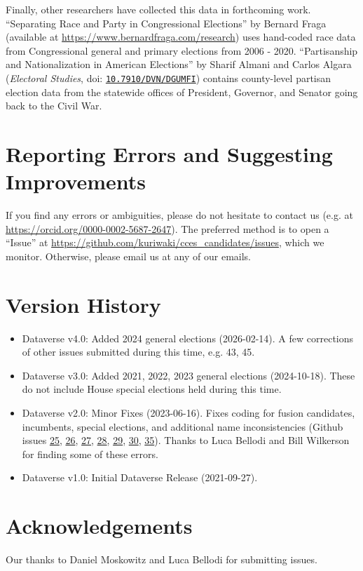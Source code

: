 \documentclass[12pt]{article}
\begin{document}


Finally, other researchers have collected this data in forthcoming work. ``Separating Race and Party in Congressional
Elections'' by Bernard Fraga (available at \url{https://www.bernardfraga.com/research}) uses hand-coded race data from Congressional general and primary elections from 2006 - 2020. ``Partisanship and Nationalization in American Elections'' by Sharif Almani and Carlos Algara (\emph{Electoral Studies}, doi: \href{https://doi.org/10.7910/DVN/DGUMFI}{\texttt{10.7910/DVN/DGUMFI}}) contains county-level partisan election data from the statewide offices of President, Governor, and Senator going back to the Civil War.

\section{Reporting Errors and Suggesting Improvements}

If you find any errors or ambiguities, please do not hesitate to contact us (e.g. at \url{https://orcid.org/0000-0002-5687-2647}). The preferred method is to open a ``Issue'' at \url{https://github.com/kuriwaki/cces_candidates/issues}, which we monitor. Otherwise, please email us at any of our emails.



\section{Version History}

\begin{itemize}
\item Dataverse v4.0: Added 2024 general elections (2026-02-14). A few corrections of other issues submitted during this time, e.g. 43, 45.
\item Dataverse v3.0: Added 2021, 2022, 2023 general elections (2024-10-18). These do not include House special elections held during this time.
\item Dataverse v2.0: Minor Fixes (2023-06-16). Fixes coding for fusion candidates, incumbents, special elections, and additional name inconsistencies (Github issues \href{https://github.com/kuriwaki/cces_candidates/issues/25}{25}, \href{https://github.com/kuriwaki/cces_candidates/issues/26}{26}, \href{https://github.com/kuriwaki/cces_candidates/issues/27}{27}, \href{https://github.com/kuriwaki/cces_candidates/issues/28}{28}, \href{https://github.com/kuriwaki/cces_candidates/issues/29}{29}, \href{https://github.com/kuriwaki/cces_candidates/issues/30}{30},
\href{https://github.com/kuriwaki/cces_candidates/issues/35}{35}). Thanks to Luca Bellodi and Bill Wilkerson for finding some of these errors.
\item Dataverse v1.0: Initial Dataverse Release (2021-09-27).
\end{itemize}

\section{Acknowledgements}
Our thanks to Daniel Moskowitz and Luca Bellodi for submitting issues.
\end{document}
